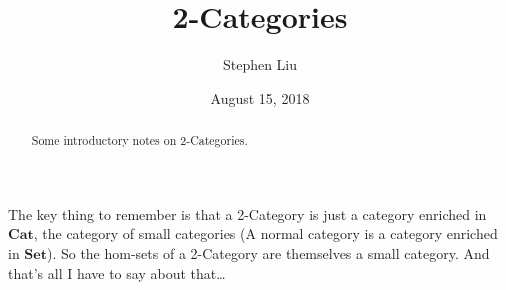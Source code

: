 \documentclass[11pt]{article}
\theoremstyle{definition}
\theoremstyle{definition}
\theoremstyle{plain}
\theoremstyle{plain}
\theoremstyle{plain}
\begin{document}
\author{Stephen Liu}
\title{2-Categories}
\date{August 15, 2018}

\maketitle

\begin{abstract}
Some introductory notes on 2-Categories.
\end{abstract}

The key thing to remember is that a 2-Category is just a category enriched in $\textbf{Cat}$, the category of small categories (A normal category is a category enriched in $\textbf{Set}$). So the hom-sets of a 2-Category are themselves a small category. And that's all I have to say about that\dots

\nocite{*}


\end{document}
